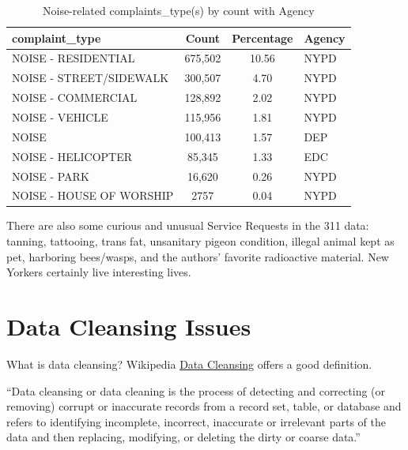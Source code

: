 \documentclass[12pt, titlepage]{article}
\begin{document}
\begin{table}[H]
    \centering
    \footnotesize
    \begin{tabular}{lS[table-format=7]S[table-format=2.2]l} %
        \toprule
        \textbf{complaint\_type} & \textbf{Count} & \textbf{Percentage} & \textbf{Agency} \\ 
        \midrule
        NOISE - RESIDENTIAL        & 675,502 & 10.56 & NYPD  \\ 
        NOISE - STREET/SIDEWALK    & 300,507 &  4.70 & NYPD  \\ 
        NOISE - COMMERCIAL         & 128,892 &  2.02 & NYPD  \\ 
        NOISE - VEHICLE            & 115,956 &  1.81 & NYPD  \\ 
        NOISE                      & 100,413 &  1.57 & DEP   \\ 
        NOISE - HELICOPTER         &  85,345 &  1.33 & EDC   \\ 
        NOISE - PARK               &  16,620 &  0.26 & NYPD  \\ 
        NOISE - HOUSE OF WORSHIP   &   2757 &  0.04 & NYPD  \\ 
        \bottomrule
    \end{tabular}
    \caption{Noise-related complaints\_type(s) by count with Agency}
    \label{tab:noisecomplaints}
\end{table}

There are also some curious and unusual Service Requests in the 311 data: 
tanning, tattooing, trans fat, unsanitary pigeon condition, illegal animal kept as pet, harboring bees/wasps, and the authors' favorite
radioactive material. New Yorkers certainly live interesting lives. 



\section{Data Cleansing Issues} \label{sec:issues}

What is data cleansing?  Wikipedia \href{https://en.wikipedia.org/wiki/Data_cleansing}{Data Cleansing} offers a good definition. 

``Data cleansing or data cleaning is the process of detecting and correcting (or removing) corrupt or inaccurate records from a record set, 
table, or database and refers to identifying incomplete, incorrect, inaccurate or irrelevant parts of the data 
and then replacing, modifying, or deleting the dirty or coarse data.''
\end{document}
